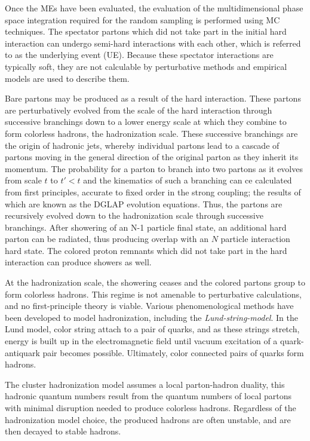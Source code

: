 Once the MEs have been evaluated, the evaluation of the multidimensional phase space integration required for the random sampling is performed using MC techniques. The spectator partons which did not take part in the initial hard interaction can undergo semi-hard interactions with each other, which is referred to as the underlying event (UE). Because these spectator interactions are typically soft, they are not calculable by perturbative methods and empirical models are used to describe them.

Bare partons may be produced as a result of the hard interaction. These partons are perturbatively evolved from the scale of the hard interaction through successive branchings down to a lower energy scale at which they combine to form colorless hadrons, the hadronization scale. These successive branchings are the origin of hadronic jets, whereby individual partons lead to a cascade of partons moving in the general direction of the original parton as they inherit its momentum. The probability for a parton to branch into two partons as it evolves from scale $t$ to $t'<t$ and the kinematics of such a branching can ce calculated from first principles, accurate to fixed order in the strong coupling; the results of which are known as the DGLAP evolution equations\cite{Altarelli:1977zs}. Thus, the partons are recursively evolved down to the hadronization scale through successive branchings. After showering of an N-1 particle final state, an additional hard parton can be radiated, thus producing overlap with an $N$ particle interaction hard state. The colored proton remnants which did not take part in the hard interaction can produce showers as well. 

At the hadronization scale, the showering ceases and the colored partons group to form colorless hadrons. This regime is not amenable to perturbative calculations, and no first-principle theory is viable. Various phenomenological methods have been developed to model hadronization, including the \textit{Lund-string-model}\cite{ANDERSSON198331}. In the Lund model, color string attach to a pair of quarks, and as these strings stretch, energy is built up in the electromagnetic field until vacuum excitation of a quark-antiquark pair becomes possible. Ultimately, color connected pairs of quarks form hadrons. 

The cluster hadronization model assumes a local parton-hadron duality, this hadronic quantum numbers result from the quantum numbers of local partons with minimal disruption needed to produce colorless hadrons. Regardless of the hadronization model choice, the produced hadrons are often unstable, and are then decayed to stable hadrons.

